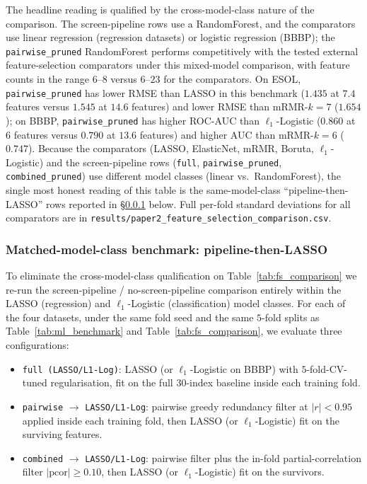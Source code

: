 \documentclass[STIX1COL]{WileyNJDv5}
\theoremstyle{definition}
\begin{document}
The headline reading is qualified by the cross-model-class
nature of the comparison. The screen-pipeline rows use a
RandomForest, and the comparators use linear regression
(regression datasets) or logistic regression (BBBP); the
\texttt{pairwise\_pruned} RandomForest performs competitively
with the tested external feature-selection comparators under this
mixed-model comparison, with feature counts in the range $6$--$8$
versus $6$--$23$ for the comparators. On ESOL,
\texttt{pairwise\_pruned} has lower RMSE than LASSO in this
benchmark ($1.435$ at $7.4$ features versus $1.545$ at $14.6$
features) and lower RMSE than mRMR-$k{=}7$ ($1.654$); on BBBP,
\texttt{pairwise\_pruned} has higher ROC-AUC than $\ell_1$-Logistic
($0.860$ at $6$ features versus $0.790$ at $13.6$ features) and
higher AUC than mRMR-$k{=}6$ ($0.747$). Because the comparators (LASSO, ElasticNet, mRMR, Boruta,
$\ell_1$-Logistic) and the screen-pipeline rows
(\texttt{full}, \texttt{pairwise\_pruned}, \texttt{combined\_pruned})
use different model classes (linear vs.\ RandomForest), the
single most honest reading of this table is the same-model-class
``pipeline-then-LASSO'' rows reported in
\S\ref{sub:pipeline_then_lasso} below. Full per-fold standard
deviations for all comparators are in
\texttt{results/paper2\_feature\_selection\_comparison.csv}.

\subsubsection{Matched-model-class benchmark: pipeline-then-LASSO}\label{sub:pipeline_then_lasso}

To eliminate the cross-model-class qualification on
Table~\ref{tab:fs_comparison} we re-run the screen-pipeline /
no-screen-pipeline comparison entirely within the LASSO
(regression) and $\ell_1$-Logistic (classification) model classes.
For each of the four datasets, under the same fold seed and the
same $5$-fold splits as Table~\ref{tab:ml_benchmark} and
Table~\ref{tab:fs_comparison}, we evaluate three configurations:

\begin{itemize}
\item \texttt{full (LASSO/L1-Log)}: LASSO (or $\ell_1$-Logistic on
BBBP) with $5$-fold-CV-tuned regularisation, fit on the full
$30$-index baseline inside each training fold.
\item \texttt{pairwise} $\to$ \texttt{LASSO/L1-Log}: pairwise
greedy redundancy filter at $|r|<0.95$ applied inside each
training fold, then LASSO (or $\ell_1$-Logistic) fit on the
surviving features.
\item \texttt{combined} $\to$ \texttt{LASSO/L1-Log}: pairwise
filter plus the in-fold partial-correlation filter
$|\mathrm{pcor}|\ge 0.10$, then LASSO (or $\ell_1$-Logistic) fit on
the survivors.
\end{itemize}
\end{document}
